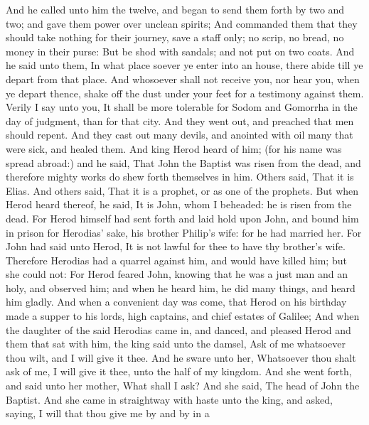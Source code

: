  And he called unto him the twelve, and began to send them
forth by two and two; and gave them power over unclean spirits;
 And commanded them that they should take nothing for
their journey, save a staff only; no scrip, no bread, no money in their
purse:  But be shod with sandals; and not put on two
coats.  And he said unto them, In what place soever ye
enter into an house, there abide till ye depart from that place.
 And whosoever shall not receive you, nor hear you, when
ye depart thence, shake off the dust under your feet for a testimony
against them. Verily I say unto you, It shall be more tolerable for
Sodom and Gomorrha in the day of judgment, than for that city.
 And they went out, and preached that men should repent.
 And they cast out many devils, and anointed with oil
many that were sick, and healed them.  And king Herod
heard of him; (for his name was spread abroad:) and he said, That John
the Baptist was risen from the dead, and therefore mighty works do shew
forth themselves in him.  Others said, That it is Elias.
And others said, That it is a prophet, or as one of the prophets.
 But when Herod heard thereof, he said, It is John, whom
I beheaded: he is risen from the dead.  For Herod himself
had sent forth and laid hold upon John, and bound him in prison for
Herodias' sake, his brother Philip's wife: for he had married her.
 For John had said unto Herod, It is not lawful for thee
to have thy brother's wife.  Therefore Herodias had a
quarrel against him, and would have killed him; but she could not:
 For Herod feared John, knowing that he was a just man
and an holy, and observed him; and when he heard him, he did many
things, and heard him gladly.  And when a convenient day
was come, that Herod on his birthday made a supper to his lords, high
captains, and chief estates of Galilee;  And when the
daughter of the said Herodias came in, and danced, and pleased Herod and
them that sat with him, the king said unto the damsel, Ask of me
whatsoever thou wilt, and I will give it thee.  And he
sware unto her, Whatsoever thou shalt ask of me, I will give it thee,
unto the half of my kingdom.  And she went forth, and
said unto her mother, What shall I ask? And she said, The head of John
the Baptist.  And she came in straightway with haste unto
the king, and asked, saying, I will that thou give me by and by in a
